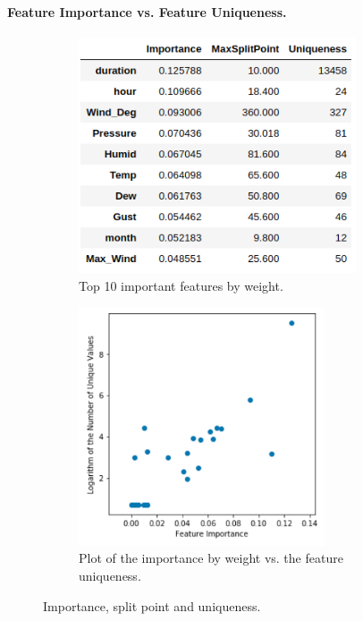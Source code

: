 \documentclass[a4paper]{article}
\begin{document}
			\paragraph{Feature Importance vs. Feature Uniqueness.}
			\begin{figure}
				\begin{subfigure}[b]{0.5\textwidth}
					\includegraphics[width=0.9\textwidth]{ImportanceSplitUniqueness.png}
					\caption{\label{fig:importance_split}Top 10 important features by weight.}
				\end{subfigure}					
				\begin{subfigure}[b]{0.5\textwidth}
					\includegraphics[width=0.8\textwidth]{ImportanceUniqueness.png}
					\caption{\label{fig:importance_unique_plot}Plot of the importance by weight vs. the feature uniqueness.}	
				\end{subfigure}
				\caption{Importance, split point and uniqueness.}
				\label{fig:import_split_unique}
			\end{figure}			
			
\end{document}

